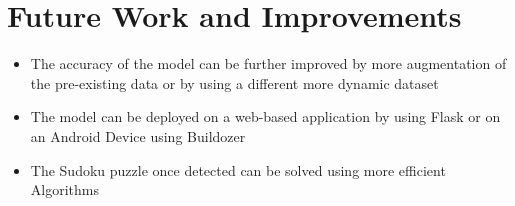 \documentclass[a4paper,12pt]{article}
\begin{document}
\section{Future Work and Improvements}
\begin{itemize}
    \item The accuracy of the model can be further improved by more augmentation of the pre-existing data or by using a different more dynamic dataset
    \item The model can be deployed on a web-based application by using Flask\cite{flask} or on an Android Device using Buildozer\cite{buildozer}
    \item The Sudoku puzzle once detected can be solved using more efficient Algorithms\cite{solver_algos}
    
\end{itemize}



%
%
%
%
\onecolumn

%
%
\end{document}
